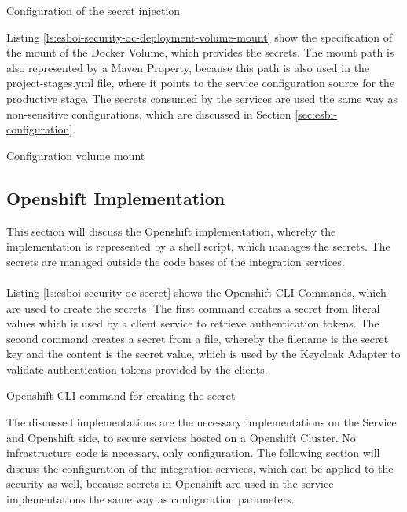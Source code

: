 \begin{listing}
	\caption{Configuration of the secret injection}
	\label{ls:esboi-security-oc-deployment-volume-secret}
\end{listing}

Listing \vref{ls:esboi-security-oc-deployment-volume-mount} show the specification of the mount of the Docker Volume, which provides the secrets. The mount path is also represented by a Maven Property, because this path is also used in the project-stages.yml file, where it points to the service configuration source for the productive stage. The secrets consumed by the services are used the same way as non-sensitive configurations, which are discussed in Section \vref{sec:esbi-configuration}.

\begin{listing}
	\caption{Configuration volume mount}
	\label{ls:esboi-security-oc-deployment-volume-mount}
\end{listing}

\subsection{Openshift Implementation}
\label{sec:esbi-security-openshift}
This section will discuss the Openshift implementation, whereby the implementation is represented by a shell script, which manages the secrets. The secrets are managed outside the code bases of the integration services.
\\ \\
Listing \vref{ls:esboi-security-oc-secret} shows the Openshift CLI-Commands, which are used to create the secrets. The first command creates a secret from literal values which is used by a client service to retrieve authentication tokens. The second command creates a secret from a file, whereby the filename is the secret key and the content is the secret value, which is used by the Keycloak Adapter to validate authentication tokens provided by the clients. 

\begin{listing}
	\caption{Openshift CLI command for creating the secret}
	\label{ls:esboi-security-oc-secret}
\end{listing}

The discussed implementations are the necessary implementations on the Service and Openshift side, to secure services hosted on a Openshift Cluster. No infrastructure code is necessary, only configuration. The following section will discuss the configuration of the integration services, which can be applied to the security as well, because secrets in Openshift are used in the service implementations the same way as configuration parameters.

